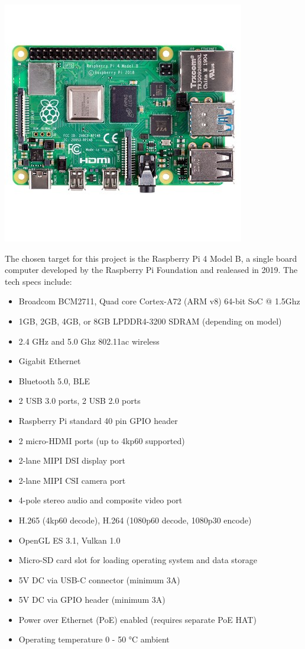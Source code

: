 \documentclass[]{article}
\begin{document}
\begin{center}
    \includegraphics[scale=0.6]{raspberry_pi_4}
\end{center}
The chosen target for this project is the Raspberry Pi 4 Model B, a single board computer developed by 
the Raspberry Pi Foundation and realeased in 2019. The tech specs include:
\begin{itemize} 
    \item Broadcom BCM2711, Quad core Cortex-A72 (ARM v8) 64-bit SoC @ 1.5Ghz
    \item 1GB, 2GB, 4GB, or 8GB LPDDR4-3200 SDRAM (depending on model)
    \item 2.4 GHz and 5.0 Ghz 802.11ac wireless
    \item Gigabit Ethernet
    \item Bluetooth 5.0, BLE
    \item 2 USB 3.0 ports, 2 USB 2.0 ports
    \item Raspberry Pi standard 40 pin GPIO header
    \item 2 micro-HDMI ports (up to 4kp60 supported)
    \item 2-lane MIPI DSI display port
    \item 2-lane MIPI CSI camera port
    \item 4-pole stereo audio and composite video port
    \item H.265 (4kp60 decode), H.264 (1080p60 decode, 1080p30 encode)
    \item OpenGL ES 3.1, Vulkan 1.0
    \item Micro-SD card slot for loading operating system and data storage
    \item 5V DC via USB-C connector (minimum 3A)
    \item 5V DC via GPIO header (minimum 3A)
    \item Power over Ethernet (PoE) enabled (requires separate PoE HAT)
    \item Operating temperature 0 - 50 °C ambient
\end{itemize}
\end{document}
